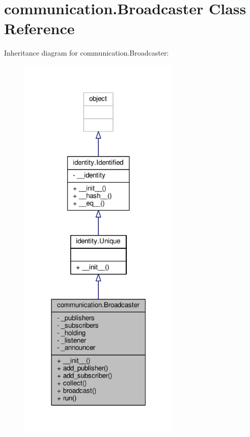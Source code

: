 \hypertarget{classcommunication_1_1Broadcaster}{}\section{communication.\+Broadcaster Class Reference}
\label{classcommunication_1_1Broadcaster}


Inheritance diagram for communication.\+Broadcaster\+:\nopagebreak
\begin{figure}[H]
\begin{center}
\leavevmode
\includegraphics[width=218pt]{classcommunication_1_1Broadcaster__inherit__graph}
\end{center}
\end{figure}


